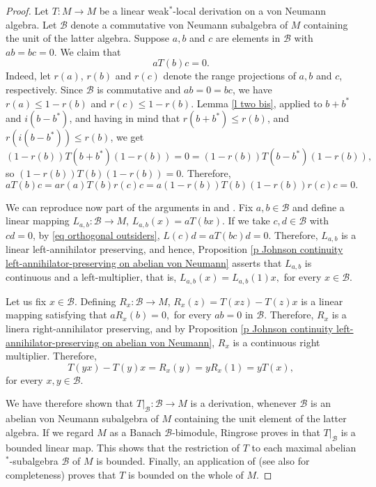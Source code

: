 \documentclass[11pt]{amsart}
\begin{document}
\begin{proof}
Let $T: M\to M$ be a linear weak$^*$-local derivation on a von Neumann algebra. Let $\mathcal{B}$ denote a commutative von Neumann subalgebra of $M$ containing the unit of the latter algebra. Suppose $a,b$ and $c$ are elements in $\mathcal{B}$ with $a b = bc =0.$ We claim that \begin{equation}\label{eq orthogonal outsiders} a T(b) c =0.
\end{equation} Indeed, let $r(a)$, $r(b)$ and $r(c)$ denote the range projections of $a,b$ and $c$, respectively. Since $\mathcal{B}$ is commutative and $ab=0=bc$, we have $r(a)\leq 1-r(b) $ and $r(c)\leq 1-r(b).$ Lemma \ref{l two bis}, applied to $b+b^*$ and $i (b-b^*)$, and having in mind that $r(b+b^*) \leq r(b)$, and $r(i(b-b^*)) \leq r(b)$, we get $(1-r(b)) T(b+b^*) (1-r(b))=0 = (1-r(b)) T(b-b^*) (1-r(b)),$ so $(1-r(b)) T(b) (1-r(b))=0.$ Therefore, $$a T(b) c = a r(a) T(b) r(c) c = a (1-r(b)) T(b) (1-r(b)) r(c) c =0.$$

We can reproduce now part of the arguments in \cite[Theorem 2.8]{LiPan} and \cite[Lemma 2.10]{AyuKudPe2014}. Fix $a,b\in \mathcal{B}$ and define a linear mapping $L_{a,b} : \mathcal{B}\to M$, $L_{a,b} (x) = aT(bx).$ If we take $c,d\in \mathcal{B}$ with $cd=0$, by \eqref{eq orthogonal outsiders}, $L(c) d = aT(bc)d =0.$ Therefore, $L_{a,b}$ is a linear left-annihilator preserving, and hence, Proposition \ref{p Johnson continuity left-annihilator-preserving on abelian von Neumann} asserts that $L_{a,b}$ is continuous and a left-multiplier, that is, $L_{a,b} (x) = L_{a,b} (1) x,$ for every $x\in \mathcal{B}$.\smallskip

Let us fix $x\in \mathcal{B}$. Defining $R_x : \mathcal{B}\to M$, $R_{x} (z) = T(xz)-T(z)x$ is a linear mapping satisfying that $a R_{x} (b) = 0,$ for every $ab=0$ in $\mathcal{B}$. Therefore, $R_{x}$ is a linera right-annihilator preserving, and by Proposition \ref{p Johnson continuity left-annihilator-preserving on abelian von Neumann}, $R_{x}$ is a continuous right multiplier. Therefore, $$T(y x) -T(y) x = R_x (y) = y R_x (1) = y T(x),$$ for every $x,y\in \mathcal{B}$.\smallskip

We have therefore shown that $T|_{\mathcal{B}}: \mathcal{B}\to M$ is a derivation, whenever $\mathcal{B}$ is an abelian von Neumann subalgebra of $M$ containing the unit element of the latter algebra.  If we regard $M$ as a Banach $\mathcal{B}$-bimodule, Ringrose proves in \cite[Theorem 2]{Ringrose72} that $T|_{\mathcal{B}}$ is a bounded linear map. This shows that the restriction of $T$ to each maximal abelian $^*$-subalgebra $\mathcal{B}$ of $M$ is bounded. Finally, an application of \cite[Theorem 2.5]{Ringrose74} (see also \cite{Cuntz} for completeness) proves that $T$ is bounded on the whole of $M$.\end{proof}
\end{document}
